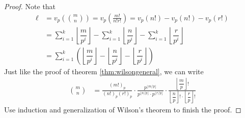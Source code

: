 \documentclass{subfile}
\begin{document}
	\begin{proof}
		Note that
			\begin{align*}
				\ell
					&= v_p\left(\binom{m}{n}\right) = v_p\left(\frac{m!}{n!r!}\right) = v_p(n!)-v_p(n!)-v_p(r!)\\
					&=\sum_{i=1}^{k}\left\lfloor\dfrac{m}{p^i}\right\rfloor - \sum_{i=1}^{k}\left\lfloor\dfrac{n}{p^i}\right\rfloor -\sum_{i=1}^{k}\left\lfloor\dfrac{r}{p^i}\right\rfloor\\
					&=\sum_{i=1}^{k}\left(\left\lfloor\dfrac{m}{p^i}\right\rfloor - \left\lfloor\dfrac{n}{p^i}\right\rfloor - \left\lfloor\dfrac{r}{p^i}\right\rfloor \right)
			\end{align*}
		Just like the proof of theorem \eqref{thm:wilsongeneral}, we can write
			\begin{align*}
				\binom {m}{n}
					& =\frac{(m!)_p}{(n!)_p (r!)_p}\cdot
				\frac{p^{\lfloor m/p\rfloor}}{p^{\lfloor n/p\rfloor} \cdot p^{\lfloor r/p\rfloor}}\cdot
				\frac{\left\lfloor\dfrac{m}{p}\right\rfloor!}{\left\lfloor\dfrac{n}{p}\right\rfloor! \cdot \left\lfloor\dfrac{r}{p}\right\rfloor!}
			\end{align*}
		Use induction and generalization of Wilson's theorem to finish the proof.
	\end{proof}
\end{document}
